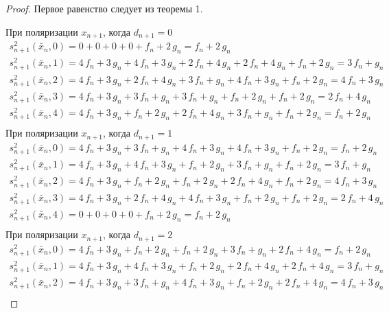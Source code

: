 \documentclass[a4paper, 12pt]{article}
\begin{document}
 \begin{proof}

Первое равенство следует из теоремы 1.

При поляризации $x_{n+1}$, когда $d_{n+1} = 0$
$$\begin{array}{l}
s_{n+1}^2(\bar{x}_n, 0) = 0 + 0 + 0 + 0 + f_n + 2\,g_n = f_n + 2\,g_n \\
s_{n+1}^2(\bar{x}_n, 1) = 4\,f_n + 3\,g_n + 4\,f_n + 3\,g_n + 2\,f_n + 4\,g_n + 2\,f_n + 4\,g_n + f_n + 2\,g_n = 3\,f_n + g_n \\
s_{n+1}^2(\bar{x}_n, 2) = 4\,f_n + 3\,g_n + 2\,f_n + 4\,g_n + 3\,f_n + g_n + 4\,f_n + 3\,g_n + f_n + 2\,g_n = 4\,f_n + 3\,g_n \\
s_{n+1}^2(\bar{x}_n, 3) = 4\,f_n + 3\,g_n + 3\,f_n + g_n + 3\,f_n + g_n + f_n + 2\,g_n + f_n + 2\,g_n = 2\,f_n + 4\,g_n \\
s_{n+1}^2(\bar{x}_n, 4) = 4\,f_n + 3\,g_n + f_n + 2\,g_n + 2\,f_n + 4\,g_n + 3\,f_n + g_n + f_n + 2\,g_n = f_n + 2\,g_n \\
\end{array}$$
При поляризации $x_{n+1}$, когда $d_{n+1} = 1$
$$\begin{array}{l}
s_{n+1}^2(\bar{x}_n, 0) = 4\,f_n + 3\,g_n + 3\,f_n + g_n + 4\,f_n + 3\,g_n + 4\,f_n + 3\,g_n + f_n + 2\,g_n = f_n + 2\,g_n \\
s_{n+1}^2(\bar{x}_n, 1) = 4\,f_n + 3\,g_n + 4\,f_n + 3\,g_n + f_n + 2\,g_n + 3\,f_n + g_n + f_n + 2\,g_n = 3\,f_n + g_n \\
s_{n+1}^2(\bar{x}_n, 2) = 4\,f_n + 3\,g_n + f_n + 2\,g_n + f_n + 2\,g_n + 2\,f_n + 4\,g_n + f_n + 2\,g_n = 4\,f_n + 3\,g_n \\
s_{n+1}^2(\bar{x}_n, 3) = 4\,f_n + 3\,g_n + 2\,f_n + 4\,g_n + 4\,f_n + 3\,g_n + f_n + 2\,g_n + f_n + 2\,g_n = 2\,f_n + 4\,g_n \\
s_{n+1}^2(\bar{x}_n, 4) = 0 + 0 + 0 + 0 + f_n + 2\,g_n = f_n + 2\,g_n \\
\end{array}$$
При поляризации $x_{n+1}$, когда $d_{n+1} = 2$
$$\begin{array}{l}
s_{n+1}^2(\bar{x}_n, 0) = 4\,f_n + 3\,g_n + f_n + 2\,g_n + f_n + 2\,g_n + 3\,f_n + g_n + 2\,f_n + 4\,g_n = f_n + 2\,g_n \\
s_{n+1}^2(\bar{x}_n, 1) = 4\,f_n + 3\,g_n + 4\,f_n + 3\,g_n + f_n + 2\,g_n + 2\,f_n + 4\,g_n + 2\,f_n + 4\,g_n = 3\,f_n + g_n \\
s_{n+1}^2(\bar{x}_n, 2) = 4\,f_n + 3\,g_n + 3\,f_n + g_n + 4\,f_n + 3\,g_n + f_n + 2\,g_n + 2\,f_n + 4\,g_n = 4\,f_n + 3\,g_n \\

\end{array}$$
\end{proof}
\end{document}

